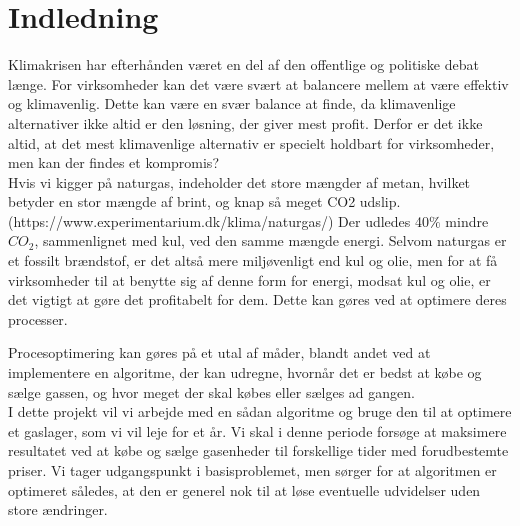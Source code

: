 \chapter{Indledning}
Klimakrisen har efterhånden været en del af den offentlige og politiske debat længe. For virksomheder kan det være svært at balancere mellem at være effektiv og klimavenlig. Dette kan være en svær balance at finde, da klimavenlige alternativer ikke altid er den løsning, der giver mest profit. Derfor er det ikke altid, at det mest klimavenlige alternativ er specielt holdbart for virksomheder, men kan der findes et kompromis? 
\\

Hvis vi kigger på naturgas, indeholder det store mængder af metan, hvilket betyder en stor mængde af brint, og knap så meget CO2 udslip. (https://www.experimentarium.dk/klima/naturgas/) Der udledes 40$\%$ mindre $CO_{2}$, sammenlignet med kul, ved den samme mængde energi. Selvom naturgas er et fossilt brændstof, er det altså mere miljøvenligt end kul og olie, men for at få virksomheder til at benytte sig af denne form for energi, modsat kul og olie, er det vigtigt at gøre det profitabelt for dem. Dette kan gøres ved at optimere deres processer.

Procesoptimering kan gøres på et utal af måder, blandt andet ved at implementere en algoritme, der kan udregne, hvornår det er bedst at købe og sælge gassen, og hvor meget der skal købes eller sælges ad gangen. 
\\

I dette projekt vil vi arbejde med en sådan algoritme og bruge den til at optimere et gaslager, som vi vil leje for et år. Vi skal i denne periode forsøge at maksimere resultatet ved at købe og sælge gasenheder til forskellige tider med forudbestemte priser. Vi tager udgangspunkt i basisproblemet, men sørger for at algoritmen er optimeret således, at den er generel nok til at løse eventuelle udvidelser uden store ændringer.

